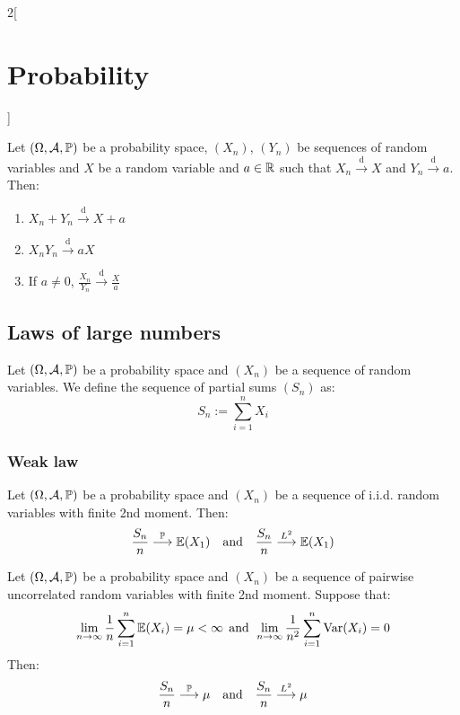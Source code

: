 \documentclass[../../../main.tex]{subfiles}
\begin{document}
\begin{multicols}{2}[\section{Probability}]
    \begin{theorem}
        Let $(\Omega,\mathcal{A},\mathbb{P})$ be a probability space, $(X_n)$, $(Y_n)$ be sequences of random variables and $X$ be a random variable and $a\in\mathbb{R}$ such that $X_n\overset{\text{d}}{\longrightarrow} X$ and $Y_n\overset{\text{d}}{\longrightarrow} a$. Then:
        \begin{enumerate}
            \item $X_n+Y_n\overset{\text{d}}{\longrightarrow} X+ a$
            \item $X_nY_n\overset{\text{d}}{\longrightarrow} aX$
            \item If $a\ne 0$, $\frac{X_n}{Y_n}\overset{\text{d}}{\longrightarrow} \frac{X}{a}$
        \end{enumerate}
    \end{theorem}
    \subsection{Laws of large numbers}
    \begin{definition}
        Let $(\Omega,\mathcal{A},\mathbb{P})$ be a probability space and $(X_n)$ be a sequence of random variables. We define the sequence of partial sums $(S_n)$ as: $$S_n:=\sum_{i=1}^nX_i$$
    \end{definition}
    \subsubsection{Weak law}
    \begin{theorem}
        Let $(\Omega,\mathcal{A},\mathbb{P})$ be a probability space and $(X_n)$ be a sequence of i.i.d. random variables with finite 2nd moment. Then: $$\frac{S_n}{n}\overset{\mathbb{P}}{\longrightarrow}\mathbb{E}(X_1)\quad\text{and}\quad\frac{S_n}{n}\overset{L^2}{\longrightarrow}\mathbb{E}(X_1)$$
    \end{theorem}
    \begin{theorem}
        Let $(\Omega,\mathcal{A},\mathbb{P})$ be a probability space and $(X_n)$ be a sequence of pairwise uncorrelated random variables with finite 2nd moment. Suppose that: $$\lim_{n\to\infty}\frac{1}{n}\sum_{i=1}^n\mathbb{E}(X_i)=\mu<\infty\;\,\text{and}\;\,\lim_{n\to\infty}\frac{1}{n^2}\sum_{i=1}^n\operatorname{Var}(X_i)=0$$ Then: $$\frac{S_n}{n}\overset{\mathbb{P}}{\longrightarrow}\mu\quad\text{and}\quad\frac{S_n}{n}\overset{L^2}{\longrightarrow}\mu$$
    \end{theorem}

\end{multicols}
\end{document}
